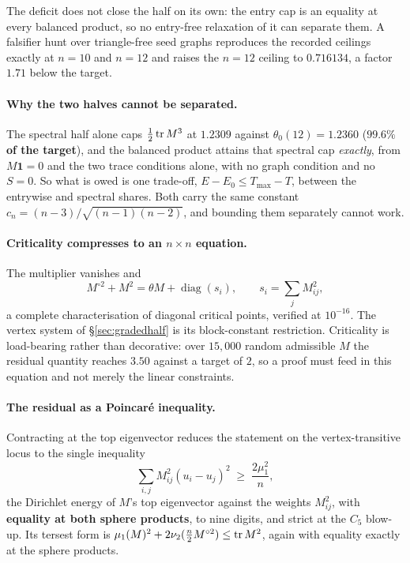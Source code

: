 The deficit does not close the half on its own: the entry cap is an equality at every balanced product, so no entry-free relaxation of it can separate them. A falsifier hunt over triangle-free seed graphs reproduces the recorded ceilings exactly at $n=10$ and $n=12$ and raises the $n=12$ ceiling to $0.716134$, a factor $1.71$ below the target.

\paragraph{Why the two halves cannot be separated.} The spectral half alone caps $\tfrac12\operatorname{tr} M^3$ at $1.2309$ against $\theta_0(12)=1.2360$ (\textbf{$99.6\%$ of the target}), and the balanced product attains that spectral cap \emph{exactly}, from $M\mathbf1=0$ and the two trace conditions alone, with no graph condition and no $S=0$. So what is owed is one trade-off, $E-E_0\le T_{\max}-T$, between the entrywise and spectral shares. Both carry the same constant $c_n=(n-3)/\sqrt{(n-1)(n-2)}$, and bounding them separately cannot work.

\paragraph{Criticality compresses to an $n\times n$ equation.} The multiplier vanishes and
\[
M^{\circ2}+M^2=\theta M+\operatorname{diag}(s_i),\qquad s_i=\sum_jM_{ij}^2 ,
\]
a complete characterisation of diagonal critical points, verified at $10^{-16}$. The vertex system of \S\ref{sec:gradedhalf} is its block-constant restriction. Criticality is load-bearing rather than decorative: over $15{,}000$ random admissible $M$ the residual quantity reaches $3.50$ against a target of $2$, so a proof must feed in this equation and not merely the linear constraints.

\paragraph{The residual as a Poincar\'e inequality.} Contracting at the top eigenvector reduces the statement on the vertex-transitive locus to the single inequality
\[
\sum_{i,j}M_{ij}^2(u_i-u_j)^2\;\ge\;\frac{2\mu_1^2}{n},
\]
the Dirichlet energy of $M$'s top eigenvector against the weights $M_{ij}^2$, with \textbf{equality at both sphere products}, to nine digits, and strict at the $C_5$ blow-up. Its tersest form is $\mu_1(M)^2+2\nu_2(\tfrac n2M^{\circ2})\le\operatorname{tr} M^2$, again with equality exactly at the sphere products.

